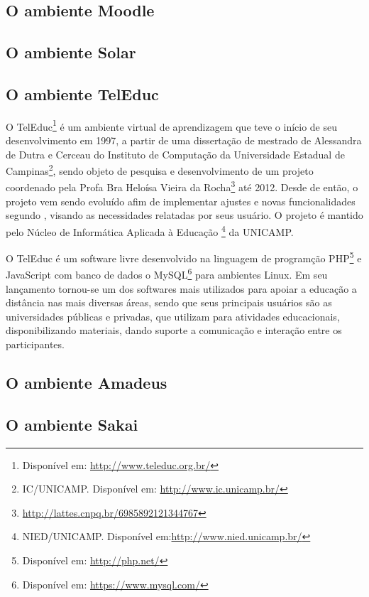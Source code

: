 \subsection{O ambiente Moodle}
\subsection{O ambiente Solar}
\subsection{O ambiente TelEduc}
O TelEduc\footnote{Disponível em: \url{http://www.teleduc.org.br/}} é um ambiente virtual de aprendizagem que teve o início de seu desenvolvimento em 1997, a partir de uma dissertação de mestrado de Alessandra de Dutra e Cerceau do Instituto de Computação da Universidade Estadual de Campinas\footnote{IC/UNICAMP. Disponível em: \url{http://www.ic.unicamp.br/}}, sendo objeto de pesquisa e desenvolvimento de um projeto coordenado pela Profa Bra Heloísa Vieira da Rocha\footnote{\url{http://lattes.cnpq.br/6985892121344767}} até 2012. Desde de então, o projeto vem sendo evoluído afim de implementar ajustes e novas funcionalidades segundo \cite{rocha2002ambiente}, visando as necessidades relatadas por seus usuário. O projeto é mantido pelo Núcleo de Informática Aplicada à Educação \footnote{NIED/UNICAMP. Disponível em:\url{http://www.nied.unicamp.br/}} da UNICAMP.

O TelEduc é um software livre desenvolvido na linguagem de programção PHP\footnote{Disponível em: \url{http://php.net/}} e JavaScript com banco de dados o MySQL\footnote{Disponível em: \url{https://www.mysql.com/}} para ambientes Linux. Em seu lançamento tornou-se um dos softwares mais utilizados para apoiar a educação a distância nas mais diversas áreas, sendo que seus principais usuários são as universidades públicas e privadas, que utilizam para atividades educacionais, disponibilizando materiais, dando suporte a comunicação e interação entre os participantes.

\subsection{O ambiente Amadeus}
\subsection{O ambiente Sakai}

